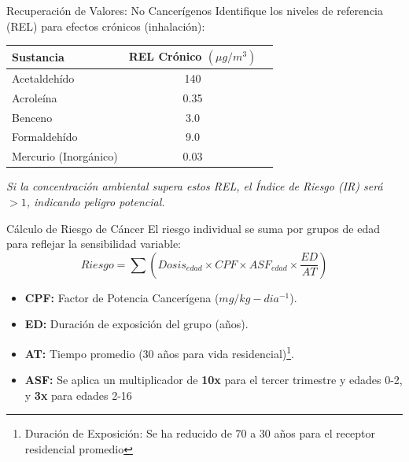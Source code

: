 \documentclass[10pt,compress]{beamer}
\begin{document}
\begin{frame}{Recuperación de Valores: No Cancerígenos}
    Identifique los niveles de referencia (REL) para efectos crónicos (inhalación):
    \begin{table}
        \centering
        \begin{tabular}{|l|c|c|}
            \hline
            \textbf{Sustancia} & \textbf{REL Crónico $(\mu g/m^3)$} \\
            \hline
            Acetaldehído & 140 \\
            Acroleína & 0.35 \\
            Benceno & 3.0 \\
            Formaldehído & 9.0 \\
            Mercurio (Inorgánico) & 0.03 \\
            \hline
        \end{tabular}
    \end{table}
    \textit{Si la concentración ambiental supera estos REL, el Índice de Riesgo (IR) será $> 1$, indicando peligro potencial.}
\end{frame}
\begin{frame}{Cálculo de Riesgo de Cáncer}
    El riesgo individual se suma por grupos de edad para reflejar la sensibilidad variable:
    \begin{equation*}
        Riesgo = \sum (Dosis_{edad} \times CPF \times ASF_{edad} \times \frac{ED}{AT})
    \end{equation*}
    \begin{itemize}
        \item \textbf{CPF:} Factor de Potencia Cancerígena ($mg/kg-dia^{-1}$).
        \item \textbf{ED:} Duración de exposición del grupo (años).
        \item \textbf{AT:} Tiempo promedio (30 años para vida residencial)\footnote{ Duración de Exposición: Se ha reducido de 70 a 30 años
para el receptor residencial promedio}.
\item \textbf{ASF:} Se aplica un multiplicador de \textbf{10x} para el tercer trimestre y edades 0-2, y \textbf{3x} para edades 2-16 
    \end{itemize}
   
\end{frame}
\end{document}

